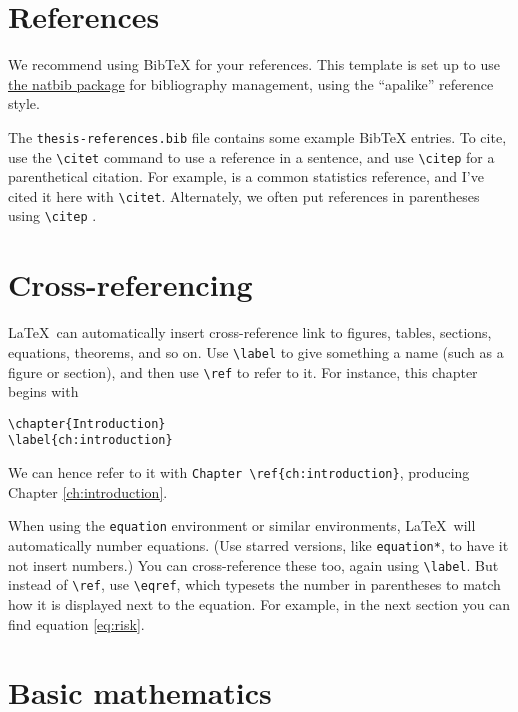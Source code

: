 \section{References}

We recommend using BibTeX for your references. This template is set up to use
\href{http://mirrors.ctan.org/macros/latex/contrib/natbib/natbib.pdf}{the natbib
  package} for bibliography management, using the ``apalike'' reference style.

The \texttt{thesis-references.bib} file contains some example BibTeX entries. To
cite, use the \verb|\citet| command to use a reference in a sentence, and use
\verb|\citep| for a parenthetical citation. For example, \citet{Wasserman:2004}
is a common statistics reference, and I've cited it here with \verb|\citet|.
Alternately, we often put references in parentheses using \verb|\citep|
\citep{Underhill:1999}.

\section{Cross-referencing}

\LaTeX\ can automatically insert cross-reference link to figures, tables,
sections, equations, theorems, and so on. Use \verb|\label| to give something a
name (such as a figure or section), and then use \verb|\ref| to refer to it. For
instance, this chapter begins with
\begin{verbatim}
\chapter{Introduction}
\label{ch:introduction}
\end{verbatim}
We can hence refer to it with \verb|Chapter \ref{ch:introduction}|, producing
Chapter \ref{ch:introduction}.

When using the \verb|equation| environment or similar environments, \LaTeX\ will
automatically number equations. (Use starred versions, like \verb|equation*|, to
have it not insert numbers.) You can cross-reference these too, again using
\verb|\label|. But instead of \verb|\ref|, use \verb|\eqref|, which typesets the
number in parentheses to match how it is displayed next to the equation. For
example, in the next section you can find equation \eqref{eq:risk}.

\section{Basic mathematics}

